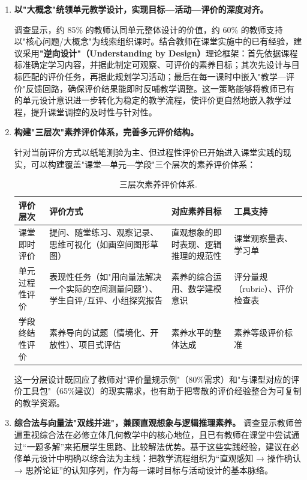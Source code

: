 \documentclass[UTF8,a4paper,12pt,twoside]{ctexart}
\begin{document}
\begin{enumerate}
    \item \textbf{以"大概念"统领单元教学设计，实现目标—活动—评价的深度对齐。}

调查显示，约 85\% 的教师认同单元整体设计的价值，约 60\% 的教师支持以"核心问题/大概念"为线索组织课时。结合教师在课堂实施中的已有经验，建议采用\textbf{"逆向设计"（Understanding by Design）}理论框架：首先依据课程标准确定学习内容，并据此制定可观察、可评价的素养目标；其次先设计与目标匹配的评价任务，再据此规划学习活动；最后在每一课时中嵌入"教学—评价"反馈回路，确保评价结果能即时反哺教学调整。这一策略能够将教师已有的单元设计意识进一步转化为稳定的教学流程，使评价更自然地嵌入教学过程，提升课堂调控的及时性与针对性。

    \item \textbf{构建"三层次"素养评价体系，完善多元评价结构。}

针对当前评价方式以纸笔测验为主、但过程性评价已开始进入课堂实践的现实，可以构建覆盖"课堂—单元—学段"三个层次的素养评价体系：

\begin{longtable}{|p{}|p{}|p{}|p{}|}
\caption{\label{tab3.22}三层次素养评价体系.} \\
\hline
评价层次 & 评价方式 & 对应素养目标 & 工具支持 \\
\hline
课堂即时评价 & 提问、随堂练习、观察记录、思维可视化（如画空间图形草图） & 直观想象的即时表现、逻辑推理的规范性 & 课堂观察量表、学习单 \\
\hline
单元过程性评价 & 表现性任务（如"用向量法解决一个实际的空间测量问题"）、学生自评/互评、小组探究报告 & 素养的综合运用、数学建模意识 & 评分量规（rubric）、评价检查表 \\
\hline
学段终结性评价 & 素养导向的试题（情境化、开放性）、项目式评估 & 素养水平的整体达成 & 素养等级评价标准 \\
\hline
\end{longtable}

这一分层设计既回应了教师对"评价量规示例"（80\%需求）和"与课型对应的评价工具包"（65\%建议）的现实需求，也有助于把零散的评价经验整合为可复制的教学资源。

    \item \textbf{综合法与向量法"双线并进"，兼顾直观想象与逻辑推理素养。}
调查显示教师普遍重视综合法在必修立体几何教学中的核心地位，且已有教师在课堂中尝试通过“一题多解”来拓展学生思路、比较解法优势。基于这些实践经验，建议在必修单元设计中明确以综合法为主线：把教学流程组织为“直观感知 → 操作确认 → 思辨论证”的认知序列，作为每一课时目标与活动设计的基本脉络。


\end{enumerate}
\end{document}
